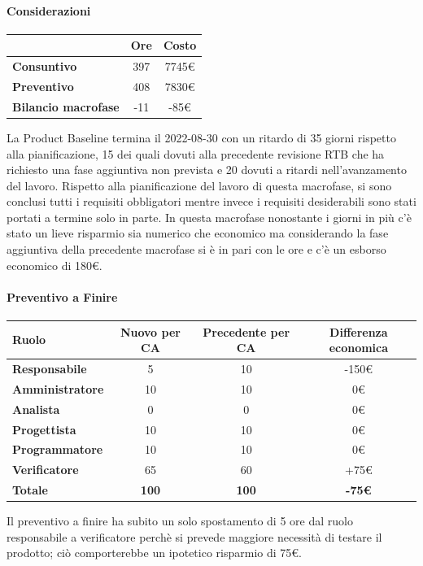 \paragraph{Considerazioni} \hfill \break
\begin{center}
	\renewcommand{\arraystretch}{1.8}
	\begin{tabular}{ | l |c|c| }
    \hline
    & \textbf{Ore} & \textbf{Costo} \\
	\hline
    \textbf{Consuntivo} & 397 & 7745\euro \\
    \hline
    \textbf{Preventivo} & 408 & 7830\euro \\
    \hline
    \textbf{Bilancio macrofase} & -11 & -85\euro \\
    \hline
    \end{tabular}
\end{center}
La Product Baseline termina il 2022-08-30 con un ritardo di 35 giorni rispetto alla pianificazione, 15 dei quali dovuti alla precedente revisione RTB che ha richiesto una fase aggiuntiva non prevista e 20 dovuti a ritardi nell'avanzamento del lavoro. Rispetto alla pianificazione del lavoro di questa macrofase, si sono conclusi tutti i requisiti obbligatori mentre invece i requisiti desiderabili sono stati portati a termine solo in parte. In questa macrofase nonostante i giorni in più c'è stato un lieve risparmio sia numerico che economico ma considerando la fase aggiuntiva della precedente macrofase si è in pari con le ore e c'è un esborso economico di 180\euro.

\newpage
\paragraph{Preventivo a Finire} \hfill \break

\begin{center}
	\renewcommand{\arraystretch}{1.8}
	\begin{tabular}{ | l |c|c|c| }
    \hline
    \textbf{Ruolo} & \textbf{Nuovo per CA} & \textbf{Precedente per CA}  & \textbf{Differenza economica}\\
	\hline
    \textbf{Responsabile} & 5 & 10 & -150\euro \\
    \hline
    \textbf{Amministratore} & 10 & 10 & 0\euro \\
    \hline
    \textbf{Analista} & 0 & 0 & 0\euro \\
    \hline
    \textbf{Progettista} & 10 & 10 & 0\euro \\
    \hline
    \textbf{Programmatore} & 10 & 10 & 0\euro \\
    \hline
    \textbf{Verificatore} & 65 & 60 & +75\euro \\
    \hline
    \textbf{Totale} & \textbf{100} & \textbf{100} & \textbf{-75\euro} \\
    \hline
    \end{tabular}
\end{center}
Il preventivo a finire ha subito un solo spostamento di 5 ore dal ruolo responsabile a verificatore perchè si prevede maggiore necessità di testare il prodotto; ciò comporterebbe un ipotetico risparmio di 75\euro.